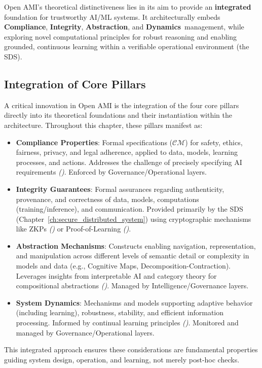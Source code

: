 \documentclass[12pt,a4paper]{report}
\renewcommand{\citep}[1]{\textit{\scriptsize{(\cite{#1})}}}
\newcommand{\Compliance}{\textbf{Compliance}}
\newcommand{\Integrity}{\textbf{Integrity}}
\newcommand{\Abstraction}{\textbf{Abstraction}}
\newcommand{\Dynamics}{\textbf{Dynamics}}
\begin{document}
	Open AMI's theoretical distinctiveness lies in its aim to provide an \textbf{integrated} foundation for trustworthy AI/ML systems. It architecturally embeds \Compliance, \Integrity, \Abstraction, and \Dynamics\ management, while exploring novel computational principles for robust reasoning and enabling grounded, continuous learning within a verifiable operational environment (the SDS).
	
	\newpage
	\subsection{Integration of Core Pillars}
	
	A critical innovation in Open AMI is the integration of the four core pillars directly into its theoretical foundations and their instantiation within the architecture. Throughout this chapter, these pillars manifest as:
	
	\begin{itemize}[noitemsep]
		\item \textbf{Compliance Properties}: Formal specifications ($\mathcal{CM}$) for safety, ethics, fairness, privacy, and legal adherence, applied to data, models, learning processes, and actions. Addresses the challenge of precisely specifying AI requirements \citep{AdditionalCitationRef48, AdditionalCitationRef48Modern}. Enforced by Governance/Operational layers.
		\newline
		\item \textbf{Integrity Guarantees}: Formal assurances regarding authenticity, provenance, and correctness of data, models, computations (training/inference), and communication. Provided primarily by the SDS (Chapter~\ref{ch:secure_distributed_system}) using cryptographic mechanisms like ZKPs \citep{Peng2025ZKMLSurvey} or Proof-of-Learning \citep{Jia2021ProofOfLearning}.
		\newline
		\item \textbf{Abstraction Mechanisms}: Constructs enabling navigation, representation, and manipulation across different levels of semantic detail or complexity in models and data (e.g., Cognitive Maps, Decomposition-Contraction). Leverages insights from interpretable AI and category theory for compositional abstractions \citep{Buehler2025AgenticGraphRef}. Managed by Intelligence/Governance layers.
		\newline
		\item \textbf{System Dynamics}: Mechanisms and models supporting adaptive behavior (including learning), robustness, stability, and efficient information processing. Informed by continual learning principles \citep{Wang2024ContinualLearningSurvey}. Monitored and managed by Governance/Operational layers.
	\end{itemize}
	This integrated approach ensures these considerations are fundamental properties guiding system design, operation, and learning, not merely post-hoc checks.
	
\end{document}
